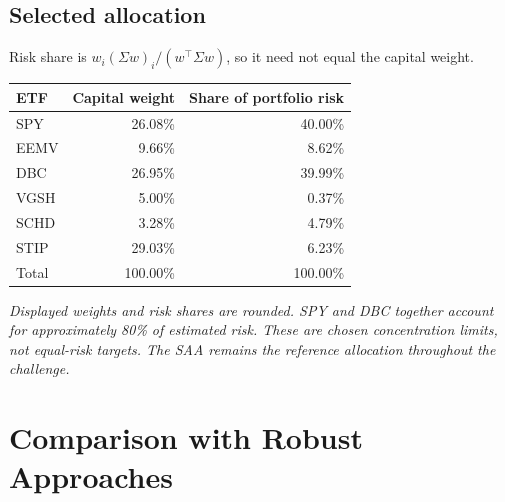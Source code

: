 \documentclass[10pt,a4paper]{article}
\renewcommand{\arraystretch}{1.3}
\begin{document}
\subsection{Selected allocation}
Risk share is $w_i(\Sigma w)_i/(w^\top\Sigma w)$, so it need not equal the capital weight.
\begin{center}
\begin{tabular}{@{}lrr@{}}
\toprule
ETF & Capital weight & Share of portfolio risk \\
\midrule
SPY & 26.08\% & 40.00\% \\
EEMV & 9.66\% & 8.62\% \\
DBC & 26.95\% & 39.99\% \\
VGSH & 5.00\% & 0.37\% \\
SCHD & 3.28\% & 4.79\% \\
STIP & 29.03\% & 6.23\% \\
\midrule
Total & 100.00\% & 100.00\% \\
\bottomrule
\end{tabular}
\end{center}
\textit{\footnotesize Displayed weights and risk shares are rounded. SPY and DBC together account for approximately 80\% of estimated risk. These are chosen concentration limits, not equal-risk targets. The SAA remains the reference allocation throughout the challenge.}
\endgroup
\endgroup\clearpage
\begingroup\titleformat{\section}{\rmfamily\LARGE\color{navy}}{\textcolor{gold}{\thesection}\hspace{.6em}}{0pt}{}\section{Comparison with Robust Approaches}
\label{sec:cp2}
\begingroup\small\renewcommand{\arraystretch}{1.05}\linespread{1.02}\selectfont
\setlength{\tabcolsep}{5pt}
\titlespacing*{\subsection}{0pt}{.55em}{.15em}
\end{document}
